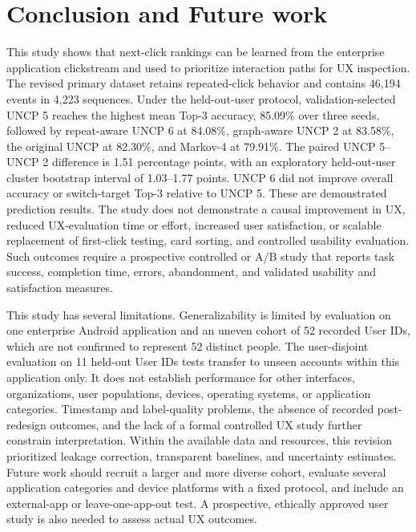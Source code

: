 \documentclass[sn-mathphys-num, Numbered]{sn-jnl}%
\theoremstyle{thmstyleone}%
\theoremstyle{thmstyletwo}%
\theoremstyle{thmstylethree}%
\providecommand{\DIFadd}[1]{{\protect\color{green!40!black}#1}} %
\providecommand{\DIFdel}[1]{}                      %
\providecommand{\DIFaddbegin}{} %
\providecommand{\DIFaddend}{} %
\providecommand{\DIFdelbegin}{} %
\providecommand{\DIFdelend}{} %
\newcommand{\DIFscaledelfig}{0.5}
\newlength{\DIFdelgraphicswidth} %
\newlength{\DIFdelgraphicsheight} %
\newcommand{\DIFaddincludegraphics}[2][]{{\color{blue}\fbox{\DIFOincludegraphics[#1]{#2}}}} %
\newcommand{\DIFdelincludegraphics}[2][]{%
\sbox{\DIFdelgraphicsbox}{\DIFOincludegraphics[#1]{#2}}%
\settoboxwidth{\DIFdelgraphicswidth}{\DIFdelgraphicsbox} %
\settoboxtotalheight{\DIFdelgraphicsheight}{\DIFdelgraphicsbox} %
\scalebox{\DIFscaledelfig}{%
\parbox[b]{\DIFdelgraphicswidth}{\usebox{\DIFdelgraphicsbox}\\[-\baselineskip] \rule{\DIFdelgraphicswidth}{0em}}\llap{\resizebox{\DIFdelgraphicswidth}{\DIFdelgraphicsheight}{%
\setlength{\unitlength}{\DIFdelgraphicswidth}%
\begin{picture}(1,1)%
\thicklines\linethickness{2pt} %
{\color[rgb]{1,0,0}\put(0,0){\framebox(1,1){}}}%
{\color[rgb]{1,0,0}\put(0,0){\line( 1,1){1}}}%
{\color[rgb]{1,0,0}\put(0,1){\line(1,-1){1}}}%
\end{picture}%
}\hspace*{3pt}}} %
} %
\DeclareRobustCommand{\DIFaddbegin}{\DIFOaddbegin \let\includegraphics\DIFaddincludegraphics} %
\DeclareRobustCommand{\DIFaddend}{\DIFOaddend \let\includegraphics\DIFOincludegraphics} %
\DeclareRobustCommand{\DIFdelbegin}{\DIFOdelbegin \let\includegraphics\DIFdelincludegraphics} %
\DeclareRobustCommand{\DIFdelend}{\DIFOaddend \let\includegraphics\DIFOincludegraphics} %
\begin{document}
\DIFaddend \section{Conclusion and Future work}
This \DIFdelbegin \DIFdel{research highlights a significant achievement: reducing the time needed for UX evaluation by using LSTM and Transformer architectures,enabled by a more precise dataset. However, a key limitation is the limited user diversity in the data}\DIFdelend \DIFaddbegin \DIFadd{study shows that next-click rankings can be learned from the enterprise application clickstream and used to prioritize interaction paths for UX inspection. The revised primary dataset retains repeated-click behavior and contains 46,194 events in 4}\DIFaddend ,\DIFdelbegin \DIFdel{collected from a single enterprise mobile app under strict privacy conditions}\DIFdelend \DIFaddbegin \DIFadd{223 sequences. Under the held-out-user protocol, validation-selected UNCP 5 reaches the highest mean Top-3 accuracy, 85.09\% over three seeds, followed by repeat-aware UNCP 6 at 84.08\%, graph-aware UNCP 2 at 83.58\%, the original UNCP at 82.30\%, and Markov-4 at 79.91\%. The paired UNCP 5--UNCP 2 difference is 1.51 percentage points, with an exploratory held-out-user cluster bootstrap interval of 1.03--1.77 points. UNCP 6 did not improve overall accuracy or switch-target Top-3 relative to UNCP 5. These are demonstrated prediction results. The study does not demonstrate a causal improvement in UX, reduced UX-evaluation time or effort, increased user satisfaction, or scalable replacement of first-click testing, card sorting, and controlled usability evaluation. Such outcomes require a prospective controlled or A/B study that reports task success, completion time, errors, abandonment, and validated usability and satisfaction measures.
}

\DIFadd{This study has several limitations. Generalizability is limited by evaluation on one enterprise Android application and an uneven cohort of 52 recorded User IDs, which are not confirmed to represent 52 distinct people. The user-disjoint evaluation on 11 held-out User IDs tests transfer to unseen accounts within this application only. It does not establish performance for other interfaces, organizations, user populations, devices, operating systems, or application categories. Timestamp and label-quality problems, the absence of recorded post-redesign outcomes, and the lack of a formal controlled UX study further constrain interpretation. Within the available data and resources, this revision prioritized leakage correction, transparent baselines, and uncertainty estimates}\DIFaddend . Future work \DIFdelbegin \DIFdel{will focus on expanding the dataset to improve generalizability, with potential applications for interactive user interfaces}\DIFdelend \DIFaddbegin \DIFadd{should recruit a larger and more diverse cohort, evaluate several application categories and device platforms with a fixed protocol, and include an external-app or leave-one-app-out test. A prospective, ethically approved user study is also needed to assess actual UX outcomes}\DIFaddend .
\end{document}
